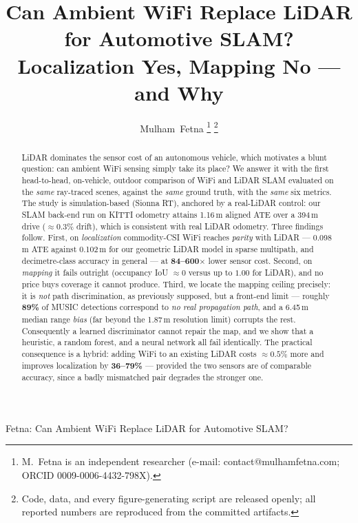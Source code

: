 \documentclass[journal]{IEEEtran}
\newcommand{\SI}[2]{#1\,#2}
\begin{document}
\title{Can Ambient WiFi Replace LiDAR for Automotive SLAM?\\
Localization Yes, Mapping No --- and Why}

\author{Mulham~Fetna%
\thanks{M.~Fetna is an independent researcher (e-mail: contact@mulhamfetna.com;
ORCID 0009-0006-4432-798X).}%
\thanks{Code, data, and every figure-generating script are released openly;
all reported numbers are reproduced from the committed artifacts.}}

%
{Fetna: Can Ambient WiFi Replace LiDAR for Automotive SLAM?}

\maketitle

\begin{abstract}
LiDAR dominates the sensor cost of an autonomous vehicle, which motivates a blunt
question: can ambient WiFi sensing simply take its place? We answer it with the first
head-to-head, on-vehicle, outdoor comparison of WiFi and LiDAR SLAM evaluated on the
\emph{same} ray-traced scenes, against the \emph{same} ground truth, with the
\emph{same} six metrics. The study is simulation-based (Sionna RT), anchored by a
real-LiDAR control: our SLAM back-end run on KITTI odometry attains
\SI{1.16}{m} aligned ATE over a \SI{394}{m} drive ($\approx0.3\%$ drift), which is
consistent with real LiDAR odometry. Three findings follow. First, on
\emph{localization} commodity-CSI WiFi reaches \emph{parity} with LiDAR ---
\SI{0.098}{m} ATE against \SI{0.102}{m} for our geometric LiDAR model in sparse
multipath, and decimetre-class accuracy in general --- at \textbf{84--600$\times$} lower
sensor cost. Second, on \emph{mapping} it fails outright
(occupancy IoU $\approx 0$ versus up to $1.00$ for LiDAR), and no price buys coverage it
cannot produce. Third, we locate the mapping ceiling precisely: it is \emph{not} path
discrimination, as previously supposed, but a front-end limit --- roughly
\textbf{89\%} of MUSIC detections correspond to \emph{no real propagation path}, and a
\SI{6.45}{m} median range \emph{bias} (far beyond the \SI{1.87}{m} resolution limit)
corrupts the rest. Consequently a learned discriminator cannot repair the map, and we
show that a heuristic, a random forest, and a neural network all fail identically. The
practical consequence is a hybrid: adding WiFi to an existing LiDAR costs
$\approx0.5\%$ more and improves localization by \textbf{36--79\%} --- provided the two
sensors are of comparable accuracy, since a badly mismatched pair degrades the stronger
one.
\end{abstract}
\end{document}
